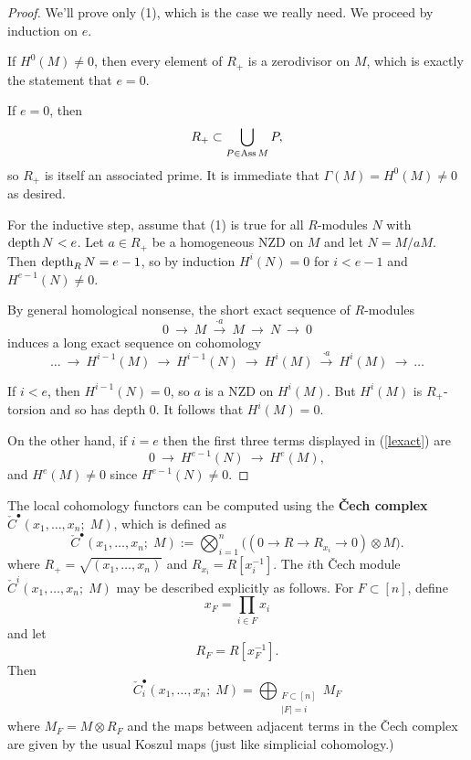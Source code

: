 \documentclass{amsart}
\newcommand{\0}{\emptyset}
\newcommand{\CE}{\check{C}}
\newcommand{\depth}{\mathop{\rm depth}\nolimits}
\newcommand{\Ass}{\mathop{\rm Ass}\nolimits}
\newcommand{\defterm}[1] {{\bf #1}}
\begin{document}
\begin{proof} We'll prove only (1), which is the case we really need.  We proceed by induction 
on $e$.

If $H^0(M) \neq 0$, then every element of $R_+$ is a zerodivisor on $M$, which is exactly the 
statement that $e=0$.

If $e=0$, then
	$$R_+ \subset \bigcup_{P \in \Ass M} P,$$
so $R_+$ is itself an associated prime.  It is immediate that $\Gamma(M) = H^0(M) \neq 0$ as 
desired.

For the inductive step, assume that (1) is true for all $R$-modules $N$ with $\depth N < e$.  
Let $a \in R_+$ be a homogeneous NZD on $M$ and let $N = M/aM$.  Then $\depth_R N = e-1$, so 
by induction $H^i(N)=0$ for $i<e-1$ and $H^{e-1}(N) \neq 0$.

By general homological nonsense, the short exact sequence of $R$-modules
	\begin{equation}
	0 ~\to~ M ~\xrightarrow{\cdot a}~ M ~\to~ N ~\to~ 0
	\end{equation}
induces a long exact sequence on cohomology 
	\begin{equation} \label{lexact}
	\dots ~\to~ H^{i-1}(M) ~\to~ H^{i-1}(N) ~\to~ H^i(M) ~\xrightarrow{\cdot a}~ H^i(M) 
	~\to~ \dots
	\end{equation}

If $i<e$, then $H^{i-1}(N)=0$, so $a$ is a NZD on $H^i(M)$.  But $H^i(M)$ is $R_+$-torsion and 
so has depth $0$.  It follows that $H^i(M)=0$.

On the other hand, if $i=e$ then the first three terms displayed in (\ref{lexact}) are
	$$0 ~\to~ H^{e-1}(N) ~\to~ H^e(M),$$
and $H^e(M) \neq 0$ since $H^{e-1}(N) \neq 0$.
\end{proof}

The local cohomology functors can be computed using the \defterm{\v{C}ech complex}
$\CE^\bullet(x_1, \dots, x_n ;\; M)$, which is defined as
	\begin{equation} \label{cech1}
	\CE^\bullet(x_1, \dots, x_n ;\; M) := \bigotimes_{i=1}^n \big( (0 \to R \to R_{x_i} 
	\to 0) \otimes M \big).
	\end{equation}
where $R_+ = \sqrt{(x_1, \dots, x_n)}$ and $R_{x_i} = R[x_i^{-1}]$.  The $i$th \v{C}ech module
$\CE^i(x_1, \dots, x_n;\; M)$ may be described explicitly as follows.  For $F \subset [n]$, 
define
	$$x_F = \prod_{i \in F} x_i$$
and let
	$$R_F = R[x_F^{-1}].$$
Then
	\begin{equation}
	\CE^\bullet_i(x_1, \dots, x_n ;\; M) = \bigoplus_{\substack{F \subset [n] \\ |F|=i}} M_F
	\end{equation}
where $M_F = M \otimes R_F$ and the maps between adjacent terms in the \v{C}ech complex are
given by the usual Koszul maps (just like simplicial cohomology.)
\end{document}
